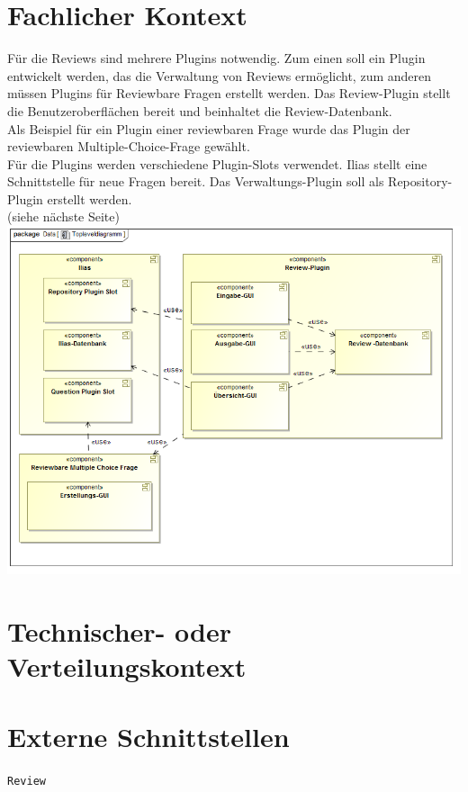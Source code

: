 \documentclass[a4paper]{scrreprt}
\begin{document}
\section{Fachlicher Kontext}
Für die Reviews sind mehrere Plugins notwendig. Zum einen soll ein Plugin entwickelt werden, das die Verwaltung von Reviews ermöglicht, zum anderen müssen Plugins für Reviewbare Fragen erstellt werden. Das Review-Plugin stellt die Benutzeroberflächen bereit und beinhaltet die Review-Datenbank.\\
Als Beispiel für ein Plugin einer reviewbaren Frage wurde das Plugin der reviewbaren Multiple-Choice-Frage gewählt.\\
Für die Plugins werden verschiedene Plugin-Slots verwendet. Ilias stellt eine Schnittstelle für neue Fragen bereit. Das Verwaltungs-Plugin soll als Repository-Plugin erstellt werden.\\ 
(siehe nächste Seite)\\

\includegraphics[width=1.0\textwidth]{Component_Diagram__Topleveldiagramm.png}
\label{Toplevel-Architektur}
\section{Technischer- oder Verteilungskontext}
\section{Externe Schnittstellen}
\texttt{Review}\\
\end{document}
